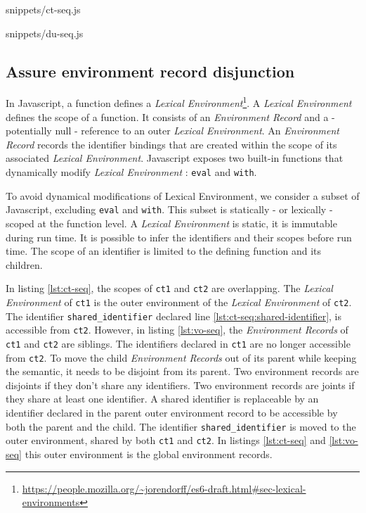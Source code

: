              {snippets/ct-seq.js}

             {snippets/du-seq.js}

\subsection{Assure environment record disjunction} \label{section:disjunction}

In Javascript, a function defines a \textit{Lexical Environment}\footnote{\url{https://people.mozilla.org/~jorendorff/es6-draft.html\#sec-lexical-environments}}.
A \textit{Lexical Environment} defines the scope of a function.
It consists of an \textit{Environment Record} and a - potentially null - reference to an outer \textit{Lexical Environment}.
An \textit{Environment Record} records the identifier bindings that are created within the scope of its associated \textit{Lexical Environment}.
Javascript exposes two built-in functions that dynamically modify \textit{Lexical Environment} : \texttt{eval} and \texttt{with}.

To avoid dynamical modifications of Lexical Environment, we consider a subset of Javascript, excluding \texttt{eval} and \texttt{with}.
This subset is statically - or lexically - scoped at the function level.
A \textit{Lexical Environment} is static, it is immutable during run time.
It is possible to infer the identifiers and their scopes before run time.
The scope of an identifier is limited to the defining function and its children.

In listing \ref{lst:ct-seq}, the scopes of \texttt{ct1} and \texttt{ct2} are overlapping.
The \textit{Lexical Environment} of \texttt{ct1} is the outer environment of the \textit{Lexical Environment} of \texttt{ct2}.
The identifier \texttt{shared_identifier} declared line \ref{lst:ct-seq:shared-identifier}, is accessible from \texttt{ct2}.
However, in listing \ref{lst:vo-seq}, the \textit{Environment Records} of \texttt{ct1} and \texttt{ct2} are siblings.
The identifiers declared in \texttt{ct1} are no longer accessible from \texttt{ct2}.
To move the child \textit{Environment Records} out of its parent while keeping the semantic, it needs to be disjoint from its parent.
Two environment records are disjoints if they don't share any identifiers.
Two environment records are joints if they share at least one identifier.
A shared identifier is replaceable by an identifier declared in the parent outer environment record to be accessible by both the parent and the child.
The identifier \texttt{shared_identifier} is moved to the outer environment, shared by both \texttt{ct1} and \texttt{ct2}.
In listings \ref{lst:ct-seq} and \ref{lst:vo-seq} this outer environment is the global environment records.

